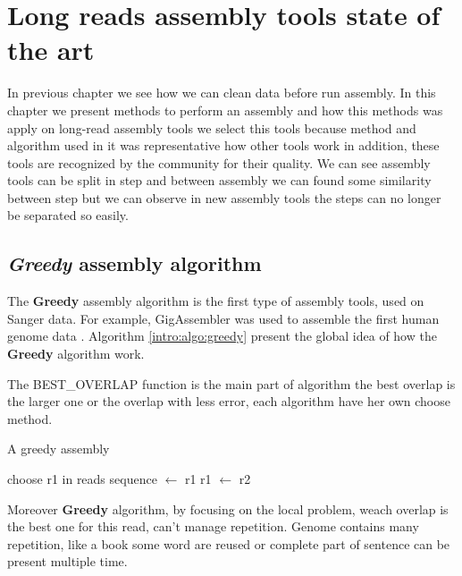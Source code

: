 \documentclass[main]{subfiles}
\begin{document}
\chapter{Long reads assembly tools state of the art}\label{chapter:sota}

In previous chapter we see how we can clean data before run assembly. In this chapter we present methods to perform an assembly and how this methods was apply on long-read assembly tools we select this tools because method and algorithm used in it was representative how other tools work in addition, these tools are recognized by the community for their quality. We can see assembly tools can be split in step and between assembly we can found some similarity between step but we can observe in new assembly tools the steps can no longer be separated so easily.

\section{\textit{Greedy} assembly algorithm}

The \textbf{Greedy} assembly algorithm is the first type of assembly tools, used on Sanger data. For example, GigAssembler was used to assemble the first human genome data \cite{GigAssembler}. Algorithm \ref{intro:algo:greedy} present the global idea of how the \textbf{Greedy} algorithm work.

The BEST\_OVERLAP function is the main part of algorithm the best overlap is the larger one or the overlap with less error, each algorithm have her own choose method.

\begin{algorithm}[ht]
    \caption{A greedy assembly}
    \begin{algorithmic}[1]
        \State choose r1 in reads
        \State sequence $\leftarrow$ r1
            \State {}
            \State {}
            \State r1 $\leftarrow$ r2
        \EndWhile
    \EndFunction
    \end{algorithmic}
    \label{intro:algo:greedy}
\end{algorithm}

Moreover \textbf{Greedy} algorithm, by focusing on the local problem, weach overlap is the best one for this read, can't manage repetition. Genome contains many repetition, like a book some word are reused or complete part of sentence can be present multiple time.
\end{document}
